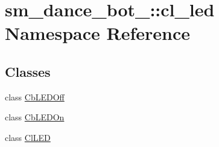 \hypertarget{namespacesm__dance__bot__2_1_1cl__led}{}\section{sm\+\_\+dance\+\_\+bot\+\_\+:\+:cl\+\_\+led Namespace Reference}
\label{namespacesm__dance__bot__2_1_1cl__led}
\subsection*{Classes}
\begin{DoxyCompactItemize}
\item 
class \hyperlink{classsm__dance__bot__2_1_1cl__led_1_1CbLEDOff}{Cb\+L\+E\+D\+Off}
\item 
class \hyperlink{classsm__dance__bot__2_1_1cl__led_1_1CbLEDOn}{Cb\+L\+E\+D\+On}
\item 
class \hyperlink{classsm__dance__bot__2_1_1cl__led_1_1ClLED}{Cl\+L\+ED}
\end{DoxyCompactItemize}
